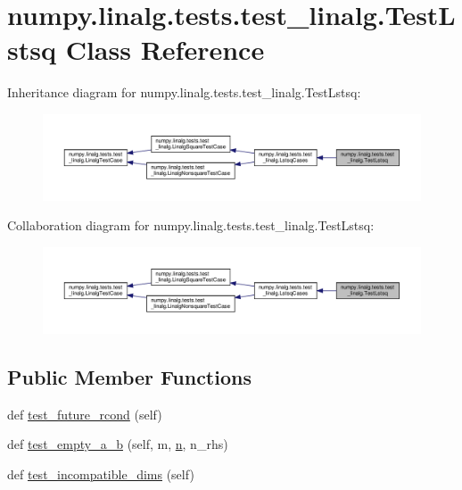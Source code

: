 \hypertarget{classnumpy_1_1linalg_1_1tests_1_1test__linalg_1_1TestLstsq}{}\section{numpy.\+linalg.\+tests.\+test\+\_\+linalg.\+Test\+Lstsq Class Reference}
\label{classnumpy_1_1linalg_1_1tests_1_1test__linalg_1_1TestLstsq}


Inheritance diagram for numpy.\+linalg.\+tests.\+test\+\_\+linalg.\+Test\+Lstsq\+:
\nopagebreak
\begin{figure}[H]
\begin{center}
\leavevmode
\includegraphics[width=350pt]{classnumpy_1_1linalg_1_1tests_1_1test__linalg_1_1TestLstsq__inherit__graph}
\end{center}
\end{figure}


Collaboration diagram for numpy.\+linalg.\+tests.\+test\+\_\+linalg.\+Test\+Lstsq\+:
\nopagebreak
\begin{figure}[H]
\begin{center}
\leavevmode
\includegraphics[width=350pt]{classnumpy_1_1linalg_1_1tests_1_1test__linalg_1_1TestLstsq__coll__graph}
\end{center}
\end{figure}
\subsection*{Public Member Functions}
\begin{DoxyCompactItemize}
\item 
def \hyperlink{classnumpy_1_1linalg_1_1tests_1_1test__linalg_1_1TestLstsq_a41c5570afc72f1d5278a650d66921b66}{test\+\_\+future\+\_\+rcond} (self)
\item 
def \hyperlink{classnumpy_1_1linalg_1_1tests_1_1test__linalg_1_1TestLstsq_a2fd9e0e3e394ebe4271b17e26e56a299}{test\+\_\+empty\+\_\+a\+\_\+b} (self, m, \hyperlink{namespacenumpy_a352663c52853d2754274407d5cae2832}{n}, n\+\_\+rhs)
\item 
def \hyperlink{classnumpy_1_1linalg_1_1tests_1_1test__linalg_1_1TestLstsq_a5e6bae341747402976570440a5fb2d1c}{test\+\_\+incompatible\+\_\+dims} (self)
\end{DoxyCompactItemize}

